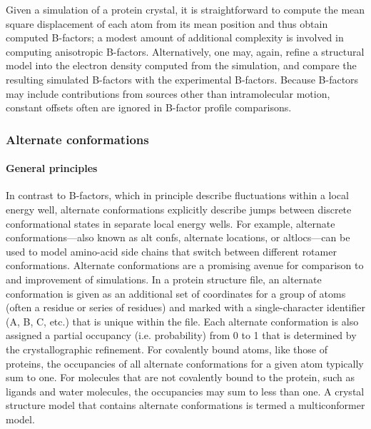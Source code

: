 \documentclass[9pt,review]{livecoms}
\begin{document}
Given a simulation of a protein crystal, it is straightforward to compute the mean square displacement of each atom from its mean position and thus obtain computed B-factors; a modest amount of additional complexity is involved in computing anisotropic B-factors.
Alternatively, one may, again, refine a structural model into the electron density computed from the simulation, and compare the resulting simulated B-factors with the experimental B-factors.
Because B-factors may include contributions from sources other than intramolecular motion, constant offsets often are ignored in B-factor profile comparisons.

\subsubsection{Alternate conformations}
\label{sub2:alt_confs}

\paragraph{General principles}

In contrast to B-factors, which in principle describe fluctuations within a local energy well, alternate conformations explicitly describe jumps between discrete conformational states in separate local energy wells.
For example, alternate conformations---also known as alt confs, alternate locations, or altlocs---can be used to model amino-acid side chains that switch between different rotamer \cite{lovell_penultimate_2000} conformations.
Alternate conformations are a promising avenue for comparison to and improvement of simulations.
In a protein structure file, an alternate conformation is given as an additional set of coordinates for a group of atoms (often a residue or series of residues) and marked with a single-character identifier (A, B, C, etc.) that is unique within the file.
Each alternate conformation is also assigned a partial occupancy (i.e. probability) from 0 to 1 that is determined by the crystallographic refinement.
For covalently bound atoms, like those of proteins, the occupancies of all alternate conformations for a given atom typically sum to one.
For molecules that are not covalently bound to the protein, such as ligands and water molecules, the occupancies may sum to less than one.
A crystal structure model that contains alternate conformations is termed a multiconformer model.
\end{document}
